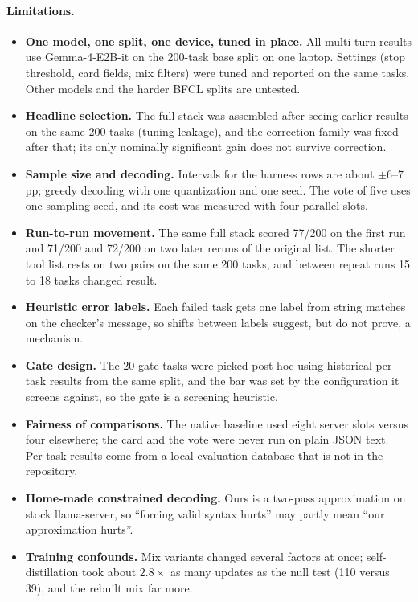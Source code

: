 \documentclass[11pt]{article}
\newcommand{\pp}{\,pp\xspace}
\begin{document}
\paragraph{Limitations.}
\begin{itemize}\setlength{\itemsep}{1pt}
  \item \textbf{One model, one split, one device, tuned in place.} All multi-turn results use Gemma-4-E2B-it on the 200-task base split on one laptop. Settings (stop threshold, card fields, mix filters) were tuned and reported on the same tasks. Other models and the harder BFCL splits are untested.
  \item \textbf{Headline selection.} The full stack was assembled after seeing earlier results on the same 200 tasks (tuning leakage), and the correction family was fixed after that; its only nominally significant gain does not survive correction.
  \item \textbf{Sample size and decoding.} Intervals for the harness rows are about $\pm6$--7\pp; greedy decoding with one quantization and one seed. The vote of five uses one sampling seed, and its cost was measured with four parallel slots.
  \item \textbf{Run-to-run movement.} The same full stack scored 77/200 on the first run and 71/200 and 72/200 on two later reruns of the original list. The shorter tool list rests on two pairs on the same 200 tasks, and between repeat runs 15 to 18 tasks changed result.
  \item \textbf{Heuristic error labels.} Each failed task gets one label from string matches on the checker's message, so shifts between labels suggest, but do not prove, a mechanism.
  \item \textbf{Gate design.} The 20 gate tasks were picked post hoc using historical per-task results from the same split, and the bar was set by the configuration it screens against, so the gate is a screening heuristic.
  \item \textbf{Fairness of comparisons.} The native baseline used eight server slots versus four elsewhere; the card and the vote were never run on plain JSON text. Per-task results come from a local evaluation database that is not in the repository.
  \item \textbf{Home-made constrained decoding.} Ours is a two-pass approximation on stock llama-server, so ``forcing valid syntax hurts'' may partly mean ``our approximation hurts''.
  \item \textbf{Training confounds.} Mix variants changed several factors at once; self-distillation took about $2.8\times$ as many updates as the null test (110 versus 39), and the rebuilt mix far more.
\end{itemize}
\end{document}
